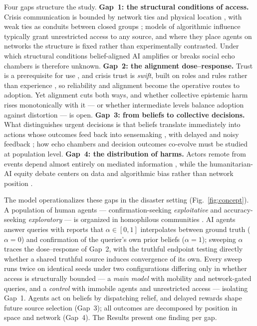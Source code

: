 \documentclass[pdflatex,sn-nature]{sn-jnl}
\begin{document}
Four gaps structure the study. \textbf{Gap~1: the structural conditions of access.} Crisis communication is bounded by network ties and physical location \citep{pan2012crisis,holguin2012unique,wolbers2018introducing}, with weak ties as conduits between closed groups \citep{granovetter1973strength}; models of algorithmic influence typically grant unrestricted access to any source, and where they place agents on networks the structure is fixed rather than experimentally contrasted. Under which structural conditions belief-aligned AI amplifies or breaks social echo chambers is therefore unknown. \textbf{Gap~2: the alignment dose--response.} Trust is a prerequisite for use \citep{glikson2020human,lee2004trust}, and crisis trust is \emph{swift}, built on roles and rules rather than experience \citep{tatham2010application}, so reliability and alignment become the operative routes to adoption. Yet alignment cuts both ways, and whether collective epistemic harm rises monotonically with it --- or whether intermediate levels balance adoption against distortion --- is open. \textbf{Gap~3: from beliefs to collective decisions.} What distinguishes urgent decisions is that beliefs translate immediately into actions whose outcomes feed back into sensemaking \citep{gralla2016problem}, with delayed and noisy feedback \citep{comes2020coordination}; how echo chambers and decision outcomes co-evolve must be studied at population level. \textbf{Gap~4: the distribution of harms.} Actors remote from events depend almost entirely on mediated information \citep{holguin2012unique}, while the humanitarian-AI equity debate centers on data and algorithmic bias rather than network position \citep{coleman2024weaving}.

The model operationalizes these gaps in the disaster setting (Fig.~\ref{fig:concept}). A population of human agents --- confirmation-seeking \emph{exploitative} and accuracy-seeking \emph{exploratory} --- is organized in homophilous communities \citep{mcpherson2001birds}. AI agents answer queries with reports that $\alpha \in [0,1]$ interpolates between ground truth ($\alpha = 0$) and confirmation of the querier's own prior beliefs ($\alpha = 1$); sweeping $\alpha$ traces the dose--response of Gap~2, with the truthful endpoint testing directly whether a shared truthful source induces convergence of its own. Every sweep runs twice on identical seeds under two configurations differing only in whether access is structurally bounded --- a \emph{main model} with mobility and network-gated queries, and a \emph{control} with immobile agents and unrestricted access --- isolating Gap~1. Agents act on beliefs by dispatching relief, and delayed rewards shape future source selection (Gap~3); all outcomes are decomposed by position in space and network (Gap~4). The Results present one finding per gap.
\end{document}
